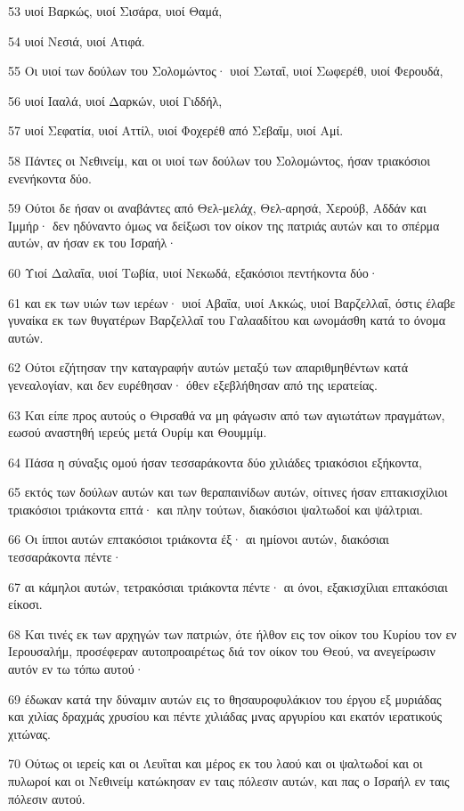 \par 53 υιοί Βαρκώς, υιοί Σισάρα, υιοί Θαμά,
\par 54 υιοί Νεσιά, υιοί Ατιφά.
\par 55 Οι υιοί των δούλων του Σολομώντος· υιοί Σωταΐ, υιοί Σωφερέθ, υιοί Φερουδά,
\par 56 υιοί Ιααλά, υιοί Δαρκών, υιοί Γιδδήλ,
\par 57 υιοί Σεφατία, υιοί Αττίλ, υιοί Φοχερέθ από Σεβαΐμ, υιοί Αμί.
\par 58 Πάντες οι Νεθινείμ, και οι υιοί των δούλων του Σολομώντος, ήσαν τριακόσιοι ενενήκοντα δύο.
\par 59 Ούτοι δε ήσαν οι αναβάντες από Θελ-μελάχ, Θελ-αρησά, Χερούβ, Αδδάν και Ιμμήρ· δεν ηδύναντο όμως να δείξωσι τον οίκον της πατριάς αυτών και το σπέρμα αυτών, αν ήσαν εκ του Ισραήλ·
\par 60 Υιοί Δαλαΐα, υιοί Τωβία, υιοί Νεκωδά, εξακόσιοι πεντήκοντα δύο·
\par 61 και εκ των υιών των ιερέων· υιοί Αβαΐα, υιοί Ακκώς, υιοί Βαρζελλαΐ, όστις έλαβε γυναίκα εκ των θυγατέρων Βαρζελλαΐ του Γαλααδίτου και ωνομάσθη κατά το όνομα αυτών.
\par 62 Ούτοι εζήτησαν την καταγραφήν αυτών μεταξύ των απαριθμηθέντων κατά γενεαλογίαν, και δεν ευρέθησαν· όθεν εξεβλήθησαν από της ιερατείας.
\par 63 Και είπε προς αυτούς ο Θιρσαθά να μη φάγωσιν από των αγιωτάτων πραγμάτων, εωσού αναστηθή ιερεύς μετά Ουρίμ και Θουμμίμ.
\par 64 Πάσα η σύναξις ομού ήσαν τεσσαράκοντα δύο χιλιάδες τριακόσιοι εξήκοντα,
\par 65 εκτός των δούλων αυτών και των θεραπαινίδων αυτών, οίτινες ήσαν επτακισχίλιοι τριακόσιοι τριάκοντα επτά· και πλην τούτων, διακόσιοι ψαλτωδοί και ψάλτριαι.
\par 66 Οι ίπποι αυτών επτακόσιοι τριάκοντα έξ· αι ημίονοι αυτών, διακόσιαι τεσσαράκοντα πέντε·
\par 67 αι κάμηλοι αυτών, τετρακόσιαι τριάκοντα πέντε· αι όνοι, εξακισχίλιαι επτακόσιαι είκοσι.
\par 68 Και τινές εκ των αρχηγών των πατριών, ότε ήλθον εις τον οίκον του Κυρίου τον εν Ιερουσαλήμ, προσέφεραν αυτοπροαιρέτως διά τον οίκον του Θεού, να ανεγείρωσιν αυτόν εν τω τόπω αυτού·
\par 69 έδωκαν κατά την δύναμιν αυτών εις το θησαυροφυλάκιον του έργου εξ μυριάδας και χιλίας δραχμάς χρυσίου και πέντε χιλιάδας μνας αργυρίου και εκατόν ιερατικούς χιτώνας.
\par 70 Ούτως οι ιερείς και οι Λευΐται και μέρος εκ του λαού και οι ψαλτωδοί και οι πυλωροί και οι Νεθινείμ κατώκησαν εν ταις πόλεσιν αυτών, και πας ο Ισραήλ εν ταις πόλεσιν αυτού.

